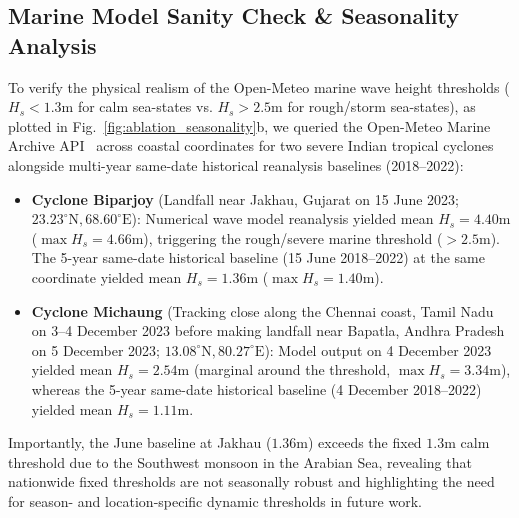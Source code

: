 \documentclass[conference]{IEEEtran}
\begin{document}
\subsection{Marine Model Sanity Check \& Seasonality Analysis}
To verify the physical realism of the Open-Meteo marine wave height thresholds ($H_s < 1.3\text{m}$ for calm sea-states vs. $H_s > 2.5\text{m}$ for rough/storm sea-states), as plotted in Fig.~\ref{fig:ablation_seasonality}b, we queried the Open-Meteo Marine Archive API~\cite{openmeteo2024marine} across coastal coordinates for two severe Indian tropical cyclones alongside multi-year same-date historical reanalysis baselines (2018--2022):
\begin{itemize}
    \item \textbf{Cyclone Biparjoy} (Landfall near Jakhau, Gujarat on 15 June 2023; $23.23^\circ\text{N}, 68.60^\circ\text{E}$): Numerical wave model reanalysis yielded mean $H_s = 4.40\text{m}$ ($\max H_s = 4.66\text{m}$), triggering the rough/severe marine threshold ($>2.5\text{m}$). The 5-year same-date historical baseline (15 June 2018--2022) at the same coordinate yielded mean $H_s = 1.36\text{m}$ ($\max H_s = 1.40\text{m}$).
    \item \textbf{Cyclone Michaung} (Tracking close along the Chennai coast, Tamil Nadu on 3--4 December 2023 before making landfall near Bapatla, Andhra Pradesh on 5 December 2023; $13.08^\circ\text{N}, 80.27^\circ\text{E}$): Model output on 4 December 2023 yielded mean $H_s = 2.54\text{m}$ (marginal around the threshold, $\max H_s = 3.34\text{m}$), whereas the 5-year same-date historical baseline (4 December 2018--2022) yielded mean $H_s = 1.11\text{m}$.
\end{itemize}
Importantly, the June baseline at Jakhau ($1.36\text{m}$) exceeds the fixed $1.3\text{m}$ calm threshold due to the Southwest monsoon in the Arabian Sea, revealing that nationwide fixed thresholds are not seasonally robust and highlighting the need for season- and location-specific dynamic thresholds in future work.
\end{document}
